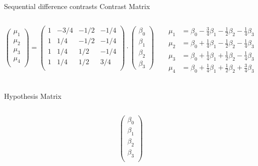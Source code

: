 \documentclass[aspectratio=169]{beamer}
\begin{document}
\begin{frame}{Sequential difference contrasts}
  \footnotesize
  Contrast Matrix
  \begin{columns}
    \begin{column}[t]{.5\textwidth}
\[
  \begin{pmatrix}
    \mu_1 \\
    \mu_2 \\
    \mu_3 \\
    \mu_4 \\
  \end{pmatrix} = 
  \begin{pmatrix}
  1 & -3/4 & -1/2 & -1/4 \\ 
  1 &  1/4 & -1/2 & -1/4 \\ 
  1 &  1/4 &  1/2 & -1/4 \\ 
  1 &  1/4 &  1/2 &  3/4 \\ 
  \end{pmatrix} \cdot
  \begin{pmatrix}
    \beta_0 \\
    \beta_1 \\
    \beta_2 \\
    \beta_3
  \end{pmatrix}
\]
    \end{column}
    \begin{column}[t]{.5\textwidth}
\begin{align*}
  \mu_1 & = \beta_0 - \frac{3}{4}\beta_1 - \frac{1}{2}\beta_2 - \frac{1}{4}\beta_3 \\
  \mu_2 & = \beta_0 + \frac{1}{4}\beta_1 - \frac{1}{2}\beta_2 - \frac{1}{4}\beta_3 \\
  \mu_3 & = \beta_0 + \frac{1}{4}\beta_1 + \frac{1}{2}\beta_2 - \frac{1}{4}\beta_3 \\
  \mu_4 & = \beta_0 + \frac{1}{4}\beta_1 + \frac{1}{2}\beta_2 + \frac{3}{4}\beta_3 \\
\end{align*}
    \end{column}
  \end{columns}
  \vspace{-1.5cm}
  Hypothesis Matrix
  \begin{columns}
    \begin{column}[t]{.5\textwidth}
\[
  \begin{pmatrix}
    \beta_0 \\
    \beta_1 \\
    \beta_2 \\
    \beta_3 \\

\end{pmatrix}\]
\end{column}
\end{columns}
\end{frame}
\end{document}
